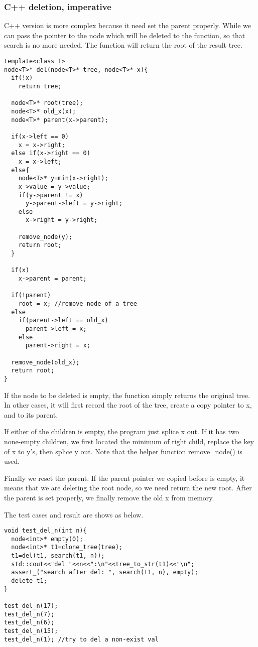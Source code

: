 \documentclass{article}
\begin{document}
\subsubsection*{C++ deletion, imperative}

C++ version is more complex because it need set the parent properly.
While we can pass the pointer to the node which will be deleted to the function,
so that search is no more needed. The function will return the root
of the result tree.

\lstset{language=C++}
\begin{lstlisting}
template<class T>
node<T>* del(node<T>* tree, node<T>* x){
  if(!x)
    return tree;

  node<T>* root(tree);
  node<T>* old_x(x);
  node<T>* parent(x->parent);

  if(x->left == 0)
    x = x->right;
  else if(x->right == 0)
    x = x->left;
  else{
    node<T>* y=min(x->right);
    x->value = y->value;
    if(y->parent != x)
      y->parent->left = y->right;
    else
      x->right = y->right;

    remove_node(y);
    return root;
  }

  if(x)
    x->parent = parent;

  if(!parent)
    root = x; //remove node of a tree
  else
    if(parent->left == old_x)
      parent->left = x;
    else
      parent->right = x;

  remove_node(old_x);
  return root;
}
\end{lstlisting}

If the node to be deleted is empty, the function simply returns the original tree.
In other cases, it will first record the root of the tree, create a copy pointer
to x, and to its parent.

If either of the children is empty, the program just splice x out. If it has two
none-empty children, we first located the minimum of right child, replace the key
of x to y's, then splice y out. Note that the helper function remove\_node() is
used.

Finally we reset the parent. If the parent pointer we copied before is empty, it
means that we are deleting the root node, so we need return the new root. After
the parent is set properly, we finally remove the old x from memory.

The test cases and result are shows as below.

\begin{lstlisting}
void test_del_n(int n){
  node<int>* empty(0);
  node<int>* t1=clone_tree(tree);
  t1=del(t1, search(t1, n));
  std::cout<<"del "<<n<<":\n"<<tree_to_str(t1)<<"\n";
  assert_("search after del: ", search(t1, n), empty);
  delete t1;
}

test_del_n(17);
test_del_n(7);
test_del_n(6);
test_del_n(15);
test_del_n(1); //try to del a non-exist val
\end{lstlisting}
\end{document}
